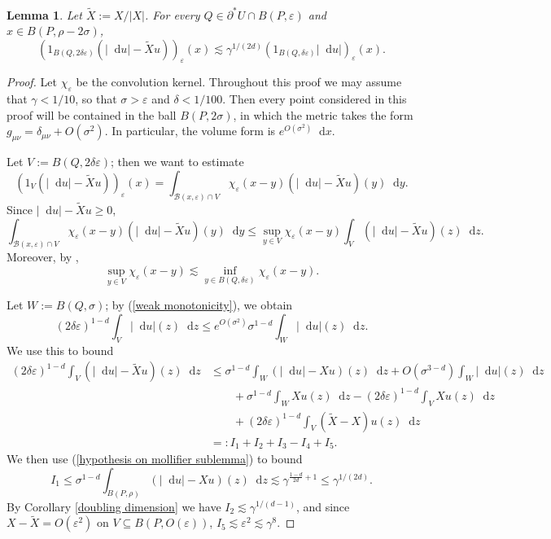 \documentclass[reqno,11pt]{amsart}
\newcommand*\dif{\mathop{}\!\mathrm{d}}
\newtheorem{lemma}[theorem]{Lemma}
\theoremstyle{definition}
\numberwithin{equation}{section}
\begin{document}
\begin{lemma}\label{mollifier sublemma}
Let $\tilde X := X/|X|$.
For every $Q \in \partial^* U \cap B(P, \varepsilon)$ and $x \in B(P, \rho - 2\sigma)$,
$$(1_{B(Q, 2\delta\varepsilon)}(|\dif u| - \tilde Xu))_\varepsilon(x) \lesssim \gamma^{1/(2d)} (1_{B(Q, \delta\varepsilon)} |\dif u|)_\varepsilon(x).$$
\end{lemma}
\begin{proof}
Let $\chi_\varepsilon$ be the convolution kernel.
Throughout this proof we may assume that $\gamma < 1/10$, so that $\sigma > \varepsilon$ and $\delta < 1/100$.
Then every point considered in this proof will be contained in the ball $B(P, 2\sigma)$, in which the metric takes the form $g_{\mu \nu} = \delta_{\mu \nu} + O(\sigma^2)$.
In particular, the volume form is $e^{O(\sigma^2)} \dif x$.

Let $V := B(Q, 2\delta\varepsilon)$; then we want to estimate 
$$(1_V(|\dif u| - \tilde Xu))_\varepsilon(x) = \int_{\mathcal B(x, \varepsilon) \cap V} \chi_\varepsilon(x - y) (|\dif u| - \tilde Xu)(y) \dif y.$$
Since $|\dif u| - \tilde Xu \geq 0$,
\begin{equation}\label{begin breaking up the mollifier}
\int_{\mathcal B(x, \varepsilon) \cap V} \chi_\varepsilon(x - y) (|\dif u| - \tilde Xu)(y) \dif y \leq \sup_{y \in V} \chi_\varepsilon(x - y) \int_V (|\dif u| - \tilde Xu)(z) \dif z.
\end{equation}
Moreover, by \cite[91]{Giusti77},
$$\sup_{y \in V} \chi_\varepsilon(x - y) \lesssim \inf_{y \in B(Q, \delta\varepsilon)} \chi_\varepsilon(x - y).$$

Let $W := B(Q, \sigma)$; by (\ref{weak monotonicity}), we obtain 
$$(2\delta\varepsilon)^{1 - d} \int_V |\dif u|(z) \dif z \leq e^{O(\sigma^2)} \sigma^{1 - d} \int_W |\dif u|(z) \dif z.$$
We use this to bound
\begin{align*}
(2\delta\varepsilon)^{1 - d} \int_V (|\dif u| - \tilde X u)(z) \dif z
&\leq \sigma^{1 - d} \int_W (|\dif u| - X u)(z) \dif z + O(\sigma^{3 - d}) \int_W |\dif u|(z) \dif z \\
&\qquad + \sigma^{1 - d} \int_W X u(z) \dif z - (2\delta\varepsilon)^{1 - d} \int_V Xu(z) \dif z \\
&\qquad + (2\delta\varepsilon)^{1 - d} \int_V (\tilde X - X)u(z) \dif z\\
&=: I_1 + I_2 + I_3 - I_4 + I_5.
\end{align*}
We then use (\ref{hypothesis on mollifier sublemma}) to bound
$$I_1 \leq \sigma^{1 - d} \int_{B(P, \rho)} (|\dif u| - X u)(z) \dif z \lesssim \gamma^{\frac{1 - d}{2d} + 1} \leq \gamma^{1/(2d)}.$$
By Corollary \ref{doubling dimension} we have $I_2 \lesssim \gamma^{1/(d - 1)}$, and since $X - \tilde X = O(\varepsilon^2)$ on $V \subseteq B(P, O(\varepsilon))$, $I_5 \lesssim \varepsilon^2 \lesssim \gamma^8$.


\end{proof}
\end{document}
